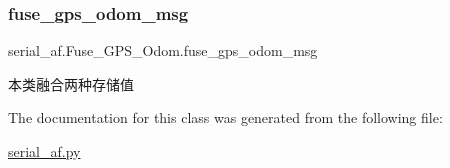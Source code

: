 \subsubsection{\texorpdfstring{fuse\+\_\+gps\+\_\+odom\+\_\+msg}{fuse\_gps\_odom\_msg}}
{\footnotesize\ttfamily serial\+\_\+af.\+Fuse\+\_\+\+G\+P\+S\+\_\+\+Odom.\+fuse\+\_\+gps\+\_\+odom\+\_\+msg}



本类融合两种存储值 



The documentation for this class was generated from the following file\+:\begin{DoxyCompactItemize}
\item 
\hyperlink{serial__af_8py}{serial\+\_\+af.\+py}\end{DoxyCompactItemize}
